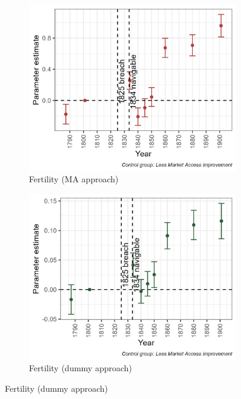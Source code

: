 \documentclass[11pt]{article}
\begin{document}
\begin{figure}[h!]
    \centering
    \caption{Effects on fertility and internal migration}
    \begin{subfigure}[b]{0.45\textwidth}
        \centering
        \caption{\label{fig:migr} Fertility (MA approach)}
        \includegraphics[width=\textwidth]{Plots/Mechanism/fertility_MA.png}
    \end{subfigure}
    \hfill
    \begin{subfigure}[b]{0.45\textwidth}
        \centering
        \caption{\label{fig:fert} Fertility (dummy approach)}
        \includegraphics[width=\textwidth]{Plots/Mechanism/fertility_Dummy.png}

\end{subfigure}
\end{figure}
\end{document}
